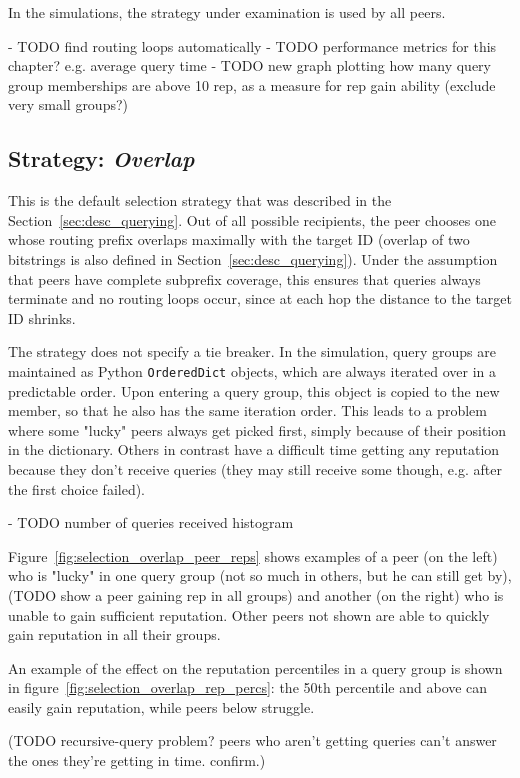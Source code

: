 In the simulations, the strategy under examination is used by all peers.

- TODO find routing loops automatically
- TODO performance metrics for this chapter? e.g. average query time
- TODO new graph plotting how many query group memberships are above 10 rep, as
  a measure for rep gain ability (exclude very small groups?)

\subsection{Strategy: \emph{Overlap}}
\label{sec:rep_avail_selection_overlap}
This is the default selection strategy that was described in the
Section~\ref{sec:desc_querying}. Out of all possible recipients, the peer
chooses one whose routing prefix overlaps maximally with the target ID (overlap
of two bitstrings is also defined in Section~\ref{sec:desc_querying}). Under the
assumption that peers have complete subprefix coverage, this ensures that
queries always terminate and no routing loops occur, since at each hop the
distance to the target ID shrinks.

The strategy does not specify a tie breaker. In the simulation, query groups are
maintained as Python \texttt{OrderedDict} objects, which are always iterated
over in a predictable order. Upon entering a query group, this object is copied
to the new member, so that he also has the same iteration order. This leads to a
problem where some "lucky" peers always get picked first, simply because of
their position in the dictionary. Others in contrast have a difficult time
getting any reputation because they don't receive queries (they may still
receive some though, e.g. after the first choice failed).

- TODO number of queries received histogram

Figure~\ref{fig:selection_overlap_peer_reps} shows examples of a peer (on the
left) who is "lucky" in one query group (not so much in others, but he can still
get by), (TODO show a peer gaining rep in all groups) and another (on the right)
who is unable to gain sufficient reputation.  Other peers not shown are able to
quickly gain reputation in all their groups.

An example of the effect on the reputation percentiles in a query group is shown
in figure~\ref{fig:selection_overlap_rep_percs}: the 50th percentile and above
can easily gain reputation, while peers below struggle.

(TODO recursive-query problem? peers who aren't getting queries can't answer the
ones they're getting in time. confirm.)

